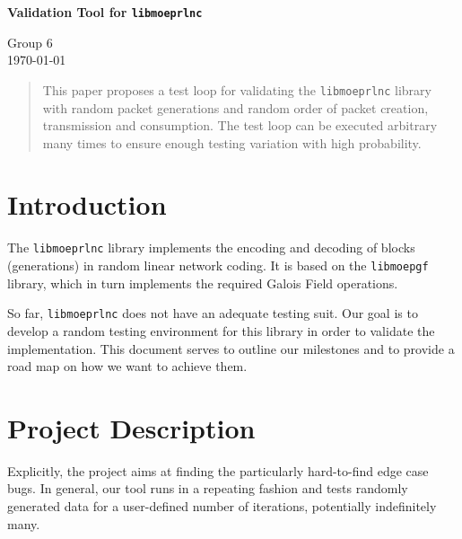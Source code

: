 \documentclass[a4paper,english,10pt]{tumarticle}
\begin{document}
\begin{center}
	\bfseries\Large Validation Tool for \texttt{libmoeprlnc}\\[.5\baselineskip]
\end{center}
\begin{center}
	\small Group 6\\
	\today
\end{center}


\setcounter{tocdepth}{1}
\renewcommand{\contentsname}{Anlagen}

\renewcommand{\emph}[1]{%
	\textcolor{TUMBlue}{#1}%
}


\renewcommand{\abstractname}{Abstract}
\begin{abstract}
\setlength{\parindent}{0pt}
\noindent%
\footnotesize

This paper proposes a test loop for validating the \texttt{libmoeprlnc} library with random packet
generations and random order of packet creation, transmission and consumption. The test loop can be
executed arbitrary many times to ensure enough testing variation with high probability.

\end{abstract}

\section{Introduction}

The \texttt{libmoeprlnc} library implements the encoding and decoding of blocks (generations) in
random linear network coding. It is based on the \texttt{libmoepgf} library, which in turn
implements the required Galois Field operations.

So far, \texttt{libmoeprlnc} does not have an adequate testing suit. Our goal is to develop a
random testing environment for this library in order to validate the
implementation. This document serves to outline our milestones and to provide a road map on how we
want to achieve them.

\section{Project Description}\label{sec:pd}

Explicitly, the project aims at finding the particularly
hard-to-find edge case bugs. In general, our tool runs in a repeating fashion and tests randomly
generated data for a user-defined number of iterations, potentially indefinitely many.
\end{document}
